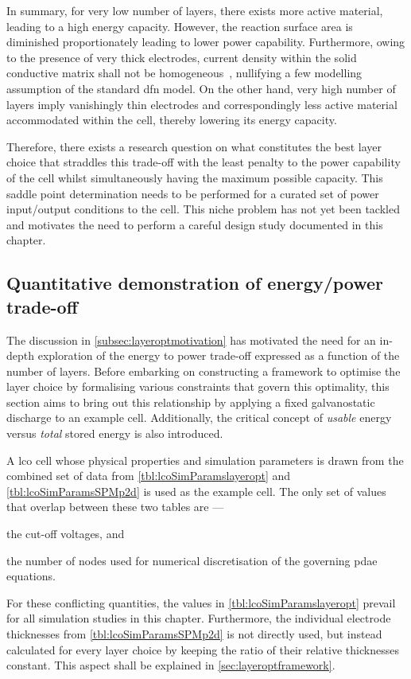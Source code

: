 In summary,  for very low number  of layers, there exists  more active material,
leading  to a  high  energy  capacity. However,  the  reaction  surface area  is
diminished proportionately leading to lower power capability. Furthermore, owing
to  the presence  of very  thick electrodes,  current density  within the  solid
conductive  matrix shall  not be  homogeneous~\cite{Pals1995}, nullifying  a few
modelling assumption  of the standard \gls{dfn}  model. On the other  hand, very
high number of layers imply vanishingly thin electrodes and correspondingly less
active  material  accommodated within  the  cell,  thereby lowering  its  energy
capacity.

Therefore, there exists  a research question on what constitutes  the best layer
choice  that straddles  this  trade-off  with the  least  penalty  to the  power
capability  of  the  cell  whilst simultaneously  having  the  maximum  possible
capacity. This  saddle point determination needs  to be performed for  a curated
set of power input/output conditions to the cell. This niche problem has not yet
been tackled and motivates the need to perform a careful design study documented
in this chapter.

\subsection{Quantitative demonstration of energy/power trade-off}\label{sec:energypowertradeoffdemo}

The discussion in \cref{subsec:layeroptmotivation} has motivated the need for an
in-depth exploration  of the energy to  power trade-off expressed as  a function
of  the number  of  layers.  Before embarking  on  constructing  a framework  to
optimise the  layer choice by  formalising various constraints that  govern this
optimality, this section aims to bring out this relationship by applying a fixed
galvanostatic discharge to  an example cell. Additionally,  the critical concept
of \emph{usable} energy versus \emph{total} stored energy is also introduced.

A  \gls{lco}  cell  whose  physical  properties  and  simulation  parameters  is
drawn from  the combined  set of  data from  \cref{tbl:lcoSimParamslayeropt} and
\cref{tbl:lcoSimParamsSPMp2d}  is used  as the  example  cell. The  only set  of
values that overlap between these two tables are ---
\begin{enumerate*}[label=\itshape\alph*\upshape)]
    \item the cut-off voltages, and
    \item the number of nodes  used for numerical  discretisation of  the governing  \gls{pdae} equations.
\end{enumerate*}
For these conflicting quantities,  the values in \cref{tbl:lcoSimParamslayeropt}
prevail for all simulation studies  in this chapter. Furthermore, the individual
electrode thicknesses  from \cref{tbl:lcoSimParamsSPMp2d} is not  directly used,
but  instead  calculated  for  every  layer  choice  by  keeping  the  ratio  of
their  relative  thicknesses  constant.  This   aspect  shall  be  explained  in
\cref{sec:layeroptframework}.

